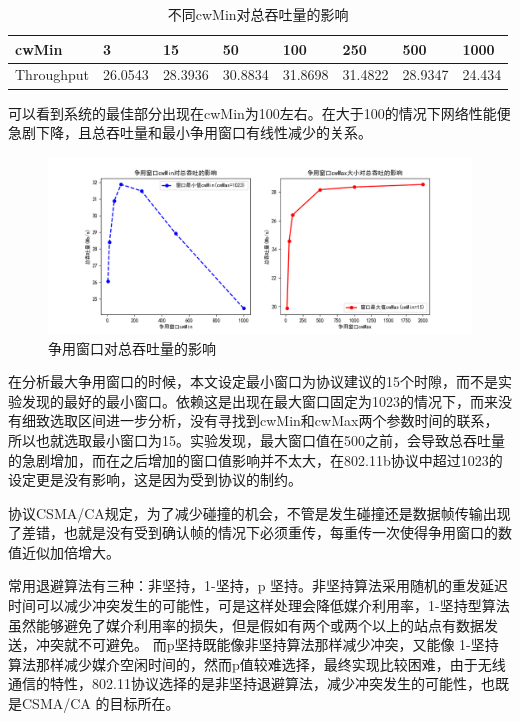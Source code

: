 \documentclass{article}
\begin{document}
\begin{table}[]
	\centering
	\begin{tabular}{llllllll}
		\hline
		cwMin      & 3       & 15      & 50      & 100     & 250     & 500     & 1000   \\
		\hline
		Throughput & 26.0543 & 28.3936 & 30.8834 & 31.8698 & 31.4822 & 28.9347 & 24.434 \\
		\hline
	\end{tabular}
	\caption{不同cwMin对总吞吐量的影响}
	\label{tab:cwMin}
\end{table}

可以看到系统的最佳部分出现在cwMin为100左右。在大于100的情况下网络性能便急剧下降，且总吞吐量和最小争用窗口有线性减少的关系。

\begin{figure}[ht]
	\centering
	\includegraphics[scale=0.6]{picture/cwMin_Max.png}
	\caption{争用窗口对总吞吐量的影响}
	\label{fig:cwMin_Max}
\end{figure}

在分析最大争用窗口的时候，本文设定最小窗口为协议建议的15个时隙，而不是实验发现的最好的最小窗口。依赖这是出现在最大窗口固定为1023的情况下，而来没有细致选取区间进一步分析，没有寻找到cwMin和cwMax两个参数时间的联系，所以也就选取最小窗口为15。实验发现，最大窗口值在500之前，会导致总吞吐量的急剧增加，而在之后增加的窗口值影响并不太大，在802.11b协议中超过1023的设定更是没有影响，这是因为受到协议的制约。

协议CSMA/CA规定，为了减少碰撞的机会，不管是发生碰撞还是数据帧传输出现了差错，也就是没有受到确认帧的情况下必须重传，每重传一次使得争用窗口的数值近似加倍增大。

常用退避算法有三种：非坚持，1-坚持，p 坚持。非坚持算法采用随机的重发延迟时间可以减少冲突发生的可能性，可是这样处理会降低媒介利用率，1-坚持型算法虽然能够避免了媒介利用率的损失，但是假如有两个或两个以上的站点有数据发送，冲突就不可避免。 而p坚持既能像非坚持算法那样减少冲突，又能像 1-坚持算法那样减少媒介空闲时间的，然而p值较难选择，最终实现比较困难，由于无线通信的特性，802.11协议选择的是非坚持退避算法，减少冲突发生的可能性，也既是CSMA/CA 的目标所在。
\end{document}
